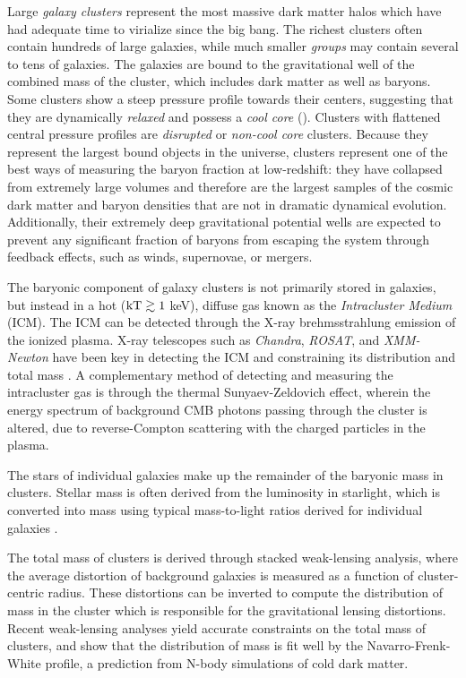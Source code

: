 Large \textit{galaxy clusters} represent the most massive dark matter
halos which have had adequate time to virialize since the big
bang. The richest clusters often contain hundreds of large galaxies,
while much smaller \textit{groups} may contain several to tens of
galaxies. The galaxies are bound to the gravitational well of the
combined mass of the cluster, which includes dark matter as well as
baryons. Some clusters show a steep pressure profile towards their
centers, suggesting that they are dynamically \textit{relaxed} and
possess a \textit{cool core} (). Clusters with
flattened central pressure profiles are \textit{disrupted}  or
\textit{non-cool core} clusters. Because they represent the largest
bound objects in the universe, clusters represent one of the best ways
of measuring the baryon fraction at low-redshift: they have collapsed
from extremely large volumes and therefore are the largest samples of
the cosmic dark matter and baryon densities that are not in dramatic
dynamical evolution. Additionally, their extremely deep gravitational
potential wells are expected to prevent any significant fraction of
baryons from escaping the system through feedback effects, such as
winds, supernovae, or mergers.

The baryonic component of galaxy clusters is not primarily stored in
galaxies, but instead in a hot ($\textrm{kT} \gtrsim 1$ keV), diffuse
gas known as the \textit{Intracluster Medium} (ICM). The ICM can be
detected through the X-ray brehmsstrahlung emission of the ionized
plasma. X-ray telescopes such as \textit{Chandra}, \textit{ROSAT}, and
\textit{XMM-Newton} have been key in detecting the ICM and
constraining its distribution and total mass . A complementary method
of detecting and measuring the intracluster gas is through the thermal
Sunyaev-Zeldovich \citep[SZ,][]{Sunyaev1972} effect, wherein the
energy spectrum of background CMB photons passing through the cluster
is altered, due to reverse-Compton scattering with the charged
particles in the plasma.

The stars of individual galaxies make up the remainder of the baryonic
mass in clusters. Stellar mass is often derived from the luminosity in
starlight, which is converted into mass using typical mass-to-light
ratios derived for individual galaxies \citep{Bahcall2014}.

The total mass of clusters is derived through stacked weak-lensing
analysis, where the average distortion of background galaxies is
measured as a function of cluster-centric radius. These distortions
can be inverted to compute the distribution of mass in the cluster
which is responsible for the gravitational lensing distortions. Recent
weak-lensing analyses \citep{Mandelbaum2008, Sheldon2009} yield
accurate constraints on the total mass of clusters, and show that the
distribution of mass is fit well by the Navarro-Frenk-White
\citep[NFW,][]{Navarro1996} profile, a prediction from N-body
simulations of cold dark matter.

